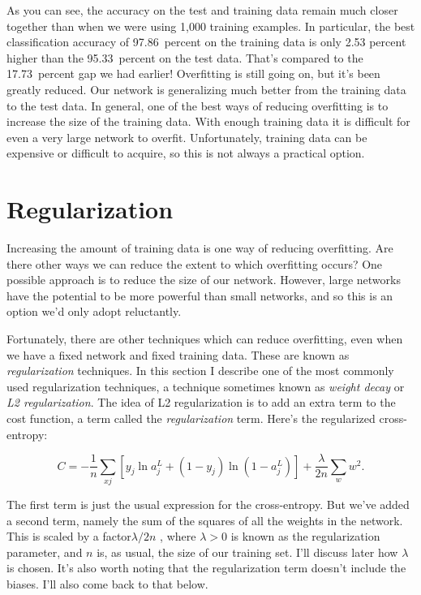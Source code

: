 As you can see, the accuracy on the test and training data remain much closer together than when we were using 1,000 training examples. In particular, the best classification accuracy of 97.86~percent on the training data is only 2.53 percent higher than the 95.33~percent on the test data. That's compared to the 17.73~percent gap we had earlier! Overfitting is still going on, but it's been greatly reduced. Our network is generalizing much better from the training data to the test data. In general, one of the best ways of reducing overfitting is to increase the size of the training data. With enough training data it is difficult for even a very large network to overfit. Unfortunately, training data can be expensive or difficult to acquire, so this is not always a practical option.


\section{Regularization}

Increasing the amount of training data is one way of reducing overfitting. Are there other ways we can reduce the extent to which overfitting occurs? One possible approach is to reduce the size of our network. However, large networks have the potential to be more powerful than small networks, and so this is an option we'd only adopt reluctantly.

Fortunately, there are other techniques which can reduce overfitting, even when we have a fixed network and fixed training data. These are known as \textit{regularization} techniques. In this section I describe one of the most commonly used regularization techniques, a technique sometimes known as \textit{weight decay} or \textit{L2 regularization}. The idea of L2 regularization is to add an extra term to the cost function, a term called the \textit{regularization} term. Here's the regularized cross-entropy:

\begin{equation}
C=-\frac{1}{n} \sum_{x j}\left[y_{j} \ln a_{j}^{L}+\left(1-y_{j}\right) \ln \left(1-a_{j}^{L}\right)\right]+\frac{\lambda}{2 n} \sum_{w} w^{2}.
\label{eq:c03-85} 
\end{equation}

The first term is just the usual expression for the cross-entropy. But we've added a second term, namely the sum of the squares of all the weights in the network. This is scaled by a factor$\lambda / 2 n$ , where $\lambda>0$ is known as the regularization parameter, and $n$ is, as usual, the size of our training set. I'll discuss later how $\lambda$ is chosen. It's also worth noting that the regularization term doesn't include the biases. I'll also come back to that below.

